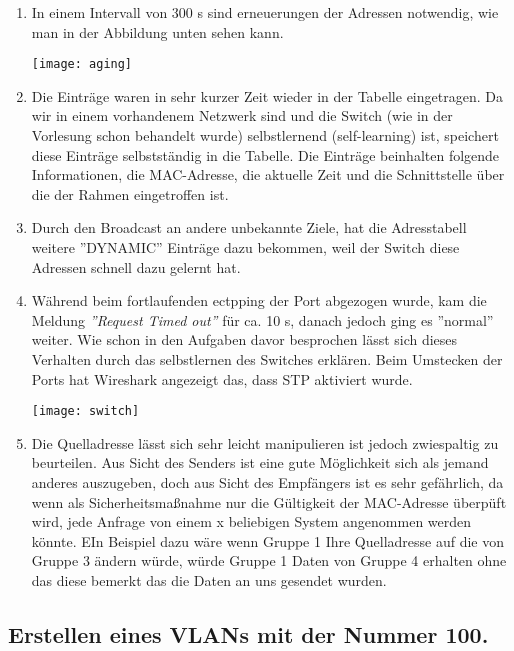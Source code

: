 \documentclass{scrartcl}
\begin{document}
  \renewcommand{\labelenumi}{\alph{enumi})}
  \begin{enumerate}
    \item
    In einem Intervall von 300 s sind erneuerungen der Adressen notwendig, wie man in der Abbildung unten sehen kann.
    
    \texttt{[image: aging]}
    \label{fig:aging}
  
  \item
  Die Einträge waren in sehr kurzer Zeit wieder in der Tabelle eingetragen. Da wir in einem vorhandenem Netzwerk sind und die Switch (wie in der Vorlesung schon behandelt wurde) selbstlernend (self-learning) ist, speichert diese Einträge selbstständig in die Tabelle. Die Einträge beinhalten folgende Informationen, die MAC-Adresse, die aktuelle Zeit und die Schnittstelle über die der Rahmen eingetroffen ist.
  
  \item
  Durch den Broadcast an andere unbekannte Ziele, hat die Adresstabell weitere ''DYNAMIC'' Einträge dazu bekommen, weil der Switch diese Adressen schnell dazu gelernt hat.
  
  \item
  Während beim fortlaufenden ectpping der Port abgezogen wurde, kam die Meldung \textit{''Request Timed out''} für ca. 10 s, danach jedoch ging es ''normal'' weiter. Wie schon in den Aufgaben davor besprochen lässt sich dieses Verhalten durch das selbstlernen des Switches erklären. Beim Umstecken der Ports hat Wireshark angezeigt das, dass STP aktiviert wurde.
  
  \texttt{[image: switch]}
  \label{fig:switch}
  
  \item
  Die Quelladresse lässt sich sehr leicht manipulieren ist jedoch zwiespaltig zu beurteilen. Aus Sicht des Senders ist eine gute Möglichkeit sich als jemand anderes auszugeben, doch aus Sicht des Empfängers ist es sehr gefährlich, da wenn als Sicherheitsmaßnahme nur die Gültigkeit der MAC-Adresse überpüft wird, jede Anfrage von einem x beliebigen System angenommen werden könnte. EIn Beispiel dazu wäre wenn Gruppe 1 Ihre Quelladresse auf die von Gruppe 3 ändern würde, würde Gruppe 1 Daten von Gruppe 4 erhalten ohne das diese bemerkt das die Daten an uns gesendet wurden.
    \end{enumerate}
    
  \subsection[Aufgabe 7 Erstellen eines VLANs mit der Nummer 100]{Erstellen eines VLANs mit der Nummer 100.}
  
\end{document}
